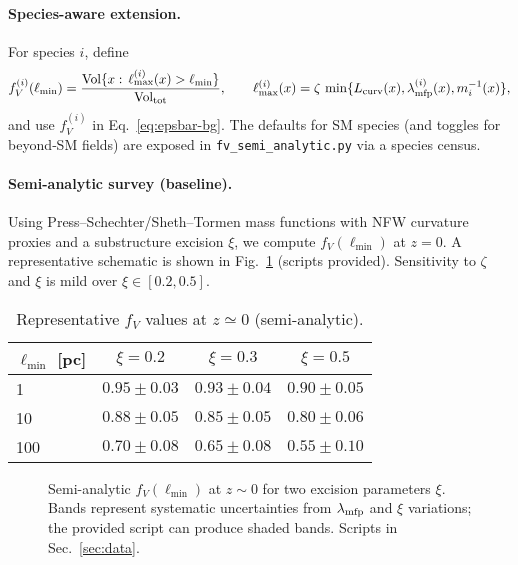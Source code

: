 \documentclass[aps,prd,onecolumn,superscriptaddress,nofootinbib]{revtex4-2}
\begin{document}
\paragraph{Species-aware extension.}
For species \(i\), define
\[
f_V^{(i)}(\ell_{\min})=\frac{\mathrm{Vol}\{x:\,\ell_{\max}^{(i)}(x)>\ell_{\min}\}}{\mathrm{Vol}_{\rm tot}},\qquad
\ell_{\max}^{(i)}(x)=\zeta\,\min\{L_{\rm curv}(x),\lambda_{\rm mfp}^{(i)}(x),m_i^{-1}(x)\},
\]
and use \(f_V^{(i)}\) in Eq.~\eqref{eq:epsbar-bg}. The defaults for SM species (and toggles for beyond‑SM fields) are exposed in \texttt{fv\_semi\_analytic.py} via a species census.

\paragraph{Semi-analytic survey (baseline).}
Using Press–Schechter/Sheth–Tormen mass functions with NFW curvature proxies and a substructure excision \(\xi\), we compute \(f_V(\ell_{\min})\) at \(z\!=\!0\). A representative schematic is shown in Fig.~\ref{fig:fV} (scripts provided). Sensitivity to \(\zeta\) and \(\xi\) is mild over \(\xi\in[0.2,0.5]\).

\begin{table}[b]
\centering
\caption{Representative \(f_V\) values at \(z\simeq 0\) (semi-analytic).}
\label{tab:fV}
\begin{tabular}{lccc}
\toprule
\(\ell_{\min}\) [pc] & \(\xi=0.2\) & \(\xi=0.3\) & \(\xi=0.5\) \\
\midrule
1   & \(0.95\pm0.03\) & \(0.93\pm0.04\) & \(0.90\pm0.05\) \\
10  & \(0.88\pm0.05\) & \(0.85\pm0.05\) & \(0.80\pm0.06\) \\
100 & \(0.70\pm0.08\) & \(0.65\pm0.08\) & \(0.55\pm0.10\) \\
\bottomrule
\end{tabular}
\end{table}

\begin{figure}[t]
\centering
{}
\caption{Semi-analytic \(f_V(\ell_{\min})\) at \(z\!\sim\!0\) for two excision parameters \(\xi\). Bands represent systematic uncertainties from \(\lambda_{\rm mfp}\) and \(\xi\) variations; the provided script can produce shaded bands. Scripts in Sec.~\ref{sec:data}.}
\label{fig:fV}
\end{figure}
\end{document}
